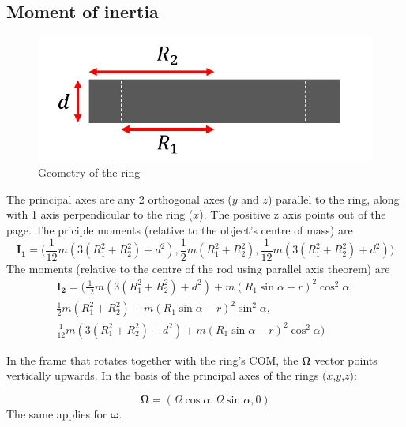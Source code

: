 \documentclass{scrartcl}
\begin{document}
\subsection{Moment of inertia}
\begin{figure}[h]
    \centering
    \includegraphics[scale=0.5]{diagram2.jpg}
    \caption{Geometry of the ring}
    \label{1}
\end{figure}

The principal axes are any 2 orthogonal axes ($y$ and $z$) parallel to the ring, along with 1 axis perpendicular to the ring ($x$). The positive z axis points out of the page. The priciple moments (relative to the object's centre of mass) are
\begin{equation}
    \mathbf{I_1}=\Bigg(\frac{1}{12}m(3(R_1^2+R_2^2)+d^2),
    \frac{1}{2}m(R_1^2+R_2^2),
    \frac{1}{12}m(3(R_1^2+R_2^2)+d^2)\Bigg)
\end{equation}
The moments (relative to the centre of the rod using parallel axis theorem) are
\begin{equation}
    \begin{aligned}
        \mathbf{I_2}=\Bigg(\frac{1}{12}m(3(R_1^2+R_2^2)+d^2)+m(R_1\sin\alpha-r)^2 \cos^2\alpha, \\
        \frac{1}{2}m(R_1^2+R_2^2)+m(R_1\sin\alpha-r)^2 \sin^2\alpha,                            \\
        \frac{1}{12}m(3(R_1^2+R_2^2)+d^2)+m(R_1\sin\alpha-r)^2 \cos^2\alpha\Bigg)
    \end{aligned}
\end{equation}

In the frame that rotates together with the ring's COM, the $\mathbf{\Omega}$ vector points vertically upwards. In the basis of the principal axes of the rings ($x$,$y$,$z$):

\begin{equation}
    \mathbf{\Omega}=(\Omega\cos\alpha,\Omega\sin\alpha,0)
\end{equation}
The same applies for $\boldsymbol{\omega}$.
\end{document}
